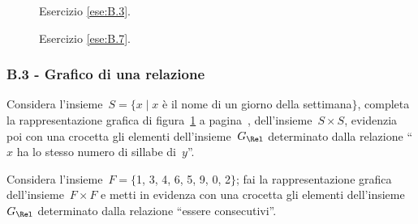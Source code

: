 \begin{figure}[t]
\begin{minipage}[b]{.45\textwidth}
 \centering
 
 \caption{Esercizio \ref{ese:B.3}.}\label{fig:B.11}
\end{minipage}\hfil
\begin{minipage}[b]{.45\textwidth}
 \centering
 
 \caption{Esercizio \ref{ese:B.7}.}\label{fig:B.12}
\end{minipage}
\end{figure}
\begin{multicols}{2}
\subsubsection*{B.3 - Grafico di una relazione}
 \begin{esercizio}
\label{ese:B.7}
Considera l'insieme~$S = \{ x \mid  x$ è il nome di un giorno della settimana$\}$, completa la rappresentazione grafica di figura~\ref{fig:B.12} a pagina~\pageref{fig:B.12}, dell'insieme~$S \times S$,
evidenzia poi con una crocetta gli elementi dell'insieme~$G_\Rel$ determinato dalla relazione ``$x$ ha lo stesso numero di sillabe di~$y$''.
\end{esercizio}

\begin{esercizio}
\label{ese:B.8}
Considera l'insieme~$F = \{$1, 3, 4, 6, 5, 9, 0, 2$\}$; fai la rappresentazione grafica dell'insieme~$F \times F$ e metti in evidenza con una crocetta gli
elementi dell'insieme~$G_\Rel$ determinato dalla relazione ``essere consecutivi''.
\end{esercizio}
\end{multicols}

